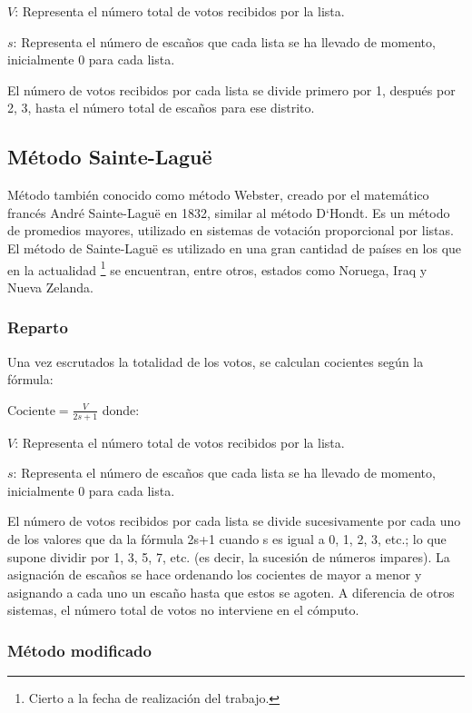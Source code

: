 \documentclass[12pt,a4paper,]{book}
\let\rmarkdownfootnote\footnote%
\def\footnote{\protect\rmarkdownfootnote}
\numberwithin{dummy}{section}
\theoremstyle{ocrenumbox}
\theoremstyle{blacknumex}
\theoremstyle{blacknumbox}
\theoremstyle{ocrenum}
\theoremstyle{ocrenum}
\begin{document}
\(V\): Representa el número total de votos recibidos por la lista.

\(s\): Representa el número de escaños que cada lista se ha llevado de
momento, inicialmente 0 para cada lista.

El número de votos recibidos por cada lista se divide primero por 1,
después por 2, 3, hasta el número total de escaños para ese distrito.

\hypertarget{muxe9todo-sainte-laguuxeb}{%
\subsection{Método Sainte-Laguë}\label{muxe9todo-sainte-laguuxeb}}

Método también conocido como método Webster, creado por el matemático
francés André Sainte-Laguë en 1832, similar al método D`Hondt. Es un
método de promedios mayores, utilizado en sistemas de votación
proporcional por listas.\\
El método de Sainte-Laguë es utilizado en una gran cantidad de países en
los que en la actualidad \footnote{Cierto a la fecha de realización del
  trabajo.} se encuentran, entre otros, estados como Noruega, Iraq y
Nueva Zelanda.

\hypertarget{reparto-1}{%
\subsubsection{Reparto}\label{reparto-1}}

Una vez escrutados la totalidad de los votos, se calculan cocientes
según la fórmula:

\(\textrm{Cociente} = \frac{V}{2s+1}\) donde:

\(V\): Representa el número total de votos recibidos por la lista.

\(s\): Representa el número de escaños que cada lista se ha llevado de
momento, inicialmente 0 para cada lista.

El número de votos recibidos por cada lista se divide sucesivamente por
cada uno de los valores que da la fórmula 2s+1 cuando s es igual a 0, 1,
2, 3, etc.; lo que supone dividir por 1, 3, 5, 7, etc. (es decir, la
sucesión de números impares). La asignación de escaños se hace ordenando
los cocientes de mayor a menor y asignando a cada uno un escaño hasta
que estos se agoten. A diferencia de otros sistemas, el número total de
votos no interviene en el cómputo.

\hypertarget{muxe9todo-modificado}{%
\subsubsection{Método modificado}\label{muxe9todo-modificado}}
\end{document}
